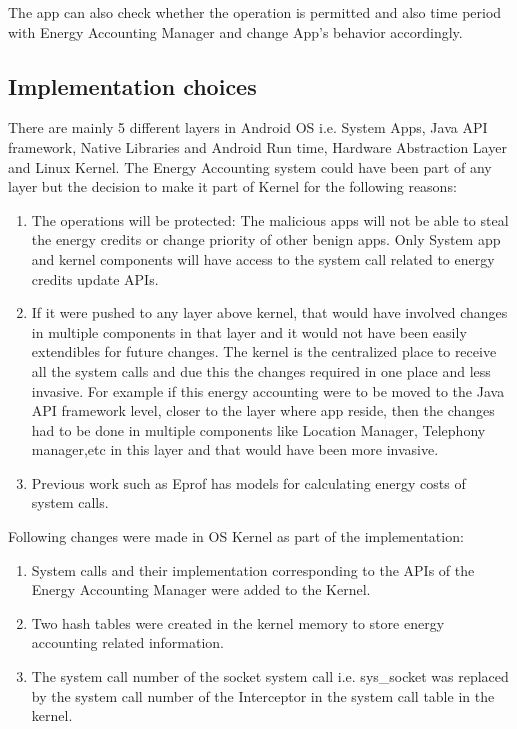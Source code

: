The app can also check whether the operation is permitted and also time period with Energy Accounting Manager and change App's behavior accordingly. 



\subsection{Implementation choices}

There are mainly 5 different layers in Android OS i.e. System Apps, Java API framework, Native Libraries and Android Run time, Hardware Abstraction Layer and Linux Kernel. The Energy Accounting system could have been part of any layer but the decision to make it part of Kernel for the following reasons:

\begin{enumerate}

\item The operations will be protected: The malicious apps will not be able to steal the energy credits or change priority of other benign apps. Only System app and kernel components will have access to the system call related to energy credits update APIs.

\item If it were pushed to any layer above kernel, that would have involved changes in multiple components in that layer and it would not have been easily extendibles for future changes. The kernel is the centralized place to receive all the system calls and due this the changes required in one place and less invasive. For example if this energy accounting were to be moved to the Java API framework level, closer to the layer where app reside, then the changes had to be done in multiple components like Location Manager, Telephony manager,etc in this layer and that would have been more invasive.

\item Previous work such as Eprof has models for calculating energy costs of system calls. 

\end{enumerate}

Following changes were made in OS Kernel as part of the implementation:

\begin{enumerate}

\item System calls and their implementation corresponding to the APIs of the Energy Accounting Manager were added to the Kernel.
\item Two hash tables were created in the kernel memory to store energy accounting related information.
\item The system call number of the socket system call i.e. sys\_socket was replaced by the system call number of the Interceptor in the system call table in the kernel.

\end{enumerate}



